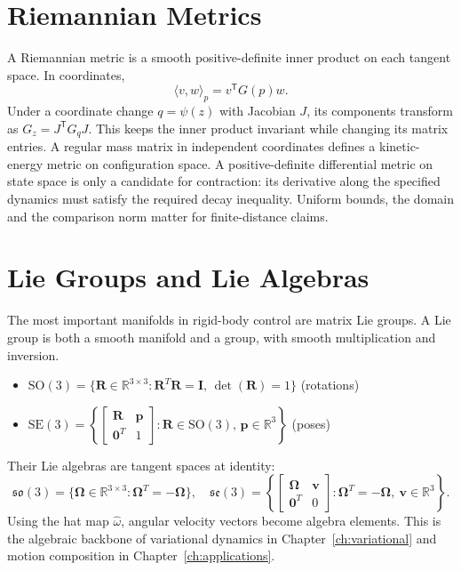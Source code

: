 \documentclass[10pt,letterpaper,openany]{book}
\theoremstyle{plain}
\theoremstyle{definition}
\theoremstyle{remark}
\renewcommand{\R}{\mathbb{R}}
\renewcommand{\T}{\mathsf{T}}   %
\renewcommand{\SO}{\mathrm{SO}}
\renewcommand{\SE}{\mathrm{SE}}
\renewcommand{\vec}[1]{\bm{#1}}
\renewcommand{\mat}[1]{\mathbf{#1}}
\begin{document}
\section{Riemannian Metrics}

A Riemannian metric is a smooth positive-definite inner product on each tangent
space. In coordinates,
\[
 \langle v,w\rangle_p=v^\T G(p)w.
\]
Under a coordinate change $q=\psi(z)$ with Jacobian $J$, its components transform
as $G_z=J^\T G_qJ$. This keeps the inner product invariant while changing its
matrix entries. A regular mass matrix in independent coordinates defines a
kinetic-energy metric on configuration space. A positive-definite differential
metric on state space is only a candidate for contraction: its derivative along
the specified dynamics must satisfy the required decay inequality. Uniform
bounds, the domain and the comparison norm matter for finite-distance claims.

\section{Lie Groups and Lie Algebras}

The most important manifolds in rigid-body control are matrix Lie groups. A Lie group is both
a smooth manifold and a group, with smooth multiplication and inversion.
\begin{itemize}
\item $\SO(3) = \{ \mat{R}\in\R^{3\times 3}: \mat{R}^T\mat{R}=\mat{I},\,\det(\mat{R})=1\}$ (rotations)
\item $\SE(3) = \left\{\begin{bmatrix}\mat{R}&\vec{p}\\\vec{0}^T&1\end{bmatrix}: \mat{R}\in\SO(3),\,\vec{p}\in\R^3\right\}$ (poses)
\end{itemize}

Their Lie algebras are tangent spaces at identity:
\[
\mathfrak{so}(3)=\{\mat{\Omega}\in\R^{3\times 3}:\mat{\Omega}^T=-\mat{\Omega}\},\quad
\mathfrak{se}(3)=\left\{\begin{bmatrix}\mat{\Omega}&\vec{v}\\\vec{0}^T&0\end{bmatrix}:\mat{\Omega}^T=-\mat{\Omega},\ \vec v\in\R^3\right\}.
\]
Using the hat map $\widehat{\omega}$, angular velocity vectors become algebra elements. This is
the algebraic backbone of variational dynamics in Chapter~\ref{ch:variational} and motion
composition in Chapter~\ref{ch:applications}.
\end{document}
